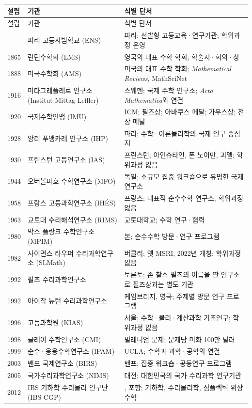 \begin{center}
\small
\renewcommand{\arraystretch}{1.08}
\begin{longtable}{@{}L{0.10\textwidth}L{0.34\textwidth}L{0.48\textwidth}@{}}
\toprule
설립 & 기관 & 식별 단서\\
\midrule
\endfirsthead
\toprule 설립 & 기관 & 식별 단서\\ \midrule \endhead
\bottomrule{} & 파리 고등사범학교 (ENS) & 파리; 선발형 고등교육·연구기관; 학위과정 운영\\
1865 & 런던수학회 (LMS) & 영국의 대표 수학 학회; 학술지·회의·상\\
1888 & 미국수학회 (AMS) & 미국의 대표 수학 학회; \textit{Mathematical Reviews}, MathSciNet\\
1916 & 미타그레플레르 연구소 (Institut Mittag-Leffler) & 스웨덴; 국제 수학 연구소; \textit{Acta Mathematica}와 연결\\
1920 & 국제수학연맹 (IMU) & ICM; 필즈상; 아바쿠스 메달; 가우스상; 천상 메달\\
1928 & 앙리 푸앵카레 연구소 (IHP) & 파리; 수학·이론물리학의 국제 연구 중심지\\
1930 & 프린스턴 고등연구소 (IAS) & 프린스턴; 아인슈타인, 폰 노이만, 괴델; 학위과정 없음\\
1944 & 오버볼파흐 수학연구소 (MFO) & 독일; 소규모 집중 워크숍으로 유명한 국제 연구소\\
1958 & 프랑스 고등과학연구소 (IHÉS) & 프랑스; 대표적 순수수학 연구소; 학위과정 없음\\
1963 & 교토대 수리해석연구소 (RIMS) & 교토대학교; 수학 연구·협력\\
1980 & 막스 플랑크 수학연구소 (MPIM) & 본; 순수수학 방문·연구 프로그램\\
1982 & 사이먼스 라우퍼 수리과학연구소 (SLMath) & 버클리; 옛 MSRI, 2022년 개칭; 학위과정 없음\\
1992 & 필즈 수리과학연구소 & 토론토; 존 찰스 필즈의 이름을 딴 연구소로 필즈상과는 별도 기관\\
1992 & 아이작 뉴턴 수리과학연구소 & 케임브리지, 영국; 주제별 방문 연구 프로그램\\
1996 & 고등과학원 (KIAS) & 서울; 수학·물리·계산과학 기초연구; 학위과정 없음\\
1998 & 클레이 수학연구소 (CMI) & 밀레니엄 문제; 문제당 미화 100만 달러\\
1999 & 순수·응용수학연구소 (IPAM) & UCLA; 수학과 과학·공학의 연결\\
2003 & 밴프 국제연구소 (BIRS) & 밴프; 집중 워크숍·공동연구 프로그램\\
2005 & 국가수리과학연구소 (NIMS) & 대전; 대한민국의 국가 수리과학 연구기관\\
2012 & IBS 기하학 수리물리 연구단 (IBS-CGP) & \POSTECH{}, 포항; 기하학, 수리물리학, 심플렉틱 위상수학\\
\end{longtable}
\end{center}

